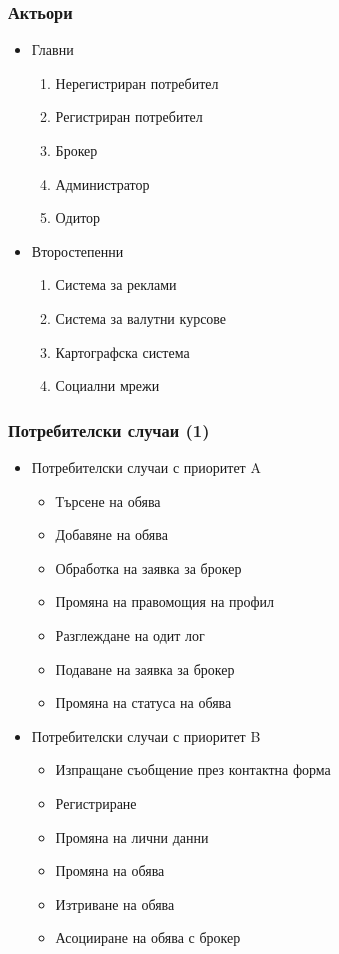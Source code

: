\documentclass[12pt]{beamer}
\begin{document}
\begin{frame}[fragile]
\frametitle{Актьори}
\begin{itemize}
	\item{Главни
		\begin{enumerate}
			\item Нерегистриран потребител
			\item Регистриран потребител
			\item Брокер
			\item Администратор
			\item Одитор
		\end{enumerate}
	}
	\item{Второстепенни
		\begin{enumerate}
			\item Система за реклами
			\item Система за валутни курсове
			\item Картографска система
			\item Социални мрежи
		\end{enumerate}
	}
\end{itemize}
\end{frame}


\begin{frame}[fragile]
\frametitle{Потребителски случаи (1)}
\begin{itemize}
	\item{Потребителски случаи с приоритет A
		\begin{itemize}
			\item Търсене на обява
			\item Добавяне на обява
			\item Обработка на заявка за брокер
			\item Промяна на правомощия на профил
			\item Разглеждане на одит лог
			\item Подаване на заявка за брокер
			\item Промяна на статуса на обява
		\end{itemize}
	}
	\item{Потребителски случаи с приоритет B
		\begin{itemize}
			\item Изпращане съобщение през контактна форма
			\item Регистриране
			\item Промяна на лични данни
			\item Промяна на обява
			\item Изтриване на обява
			\item Асоцииране на обява с брокер
		\end{itemize}
	}

\end{itemize}
\end{frame}
\end{document}
